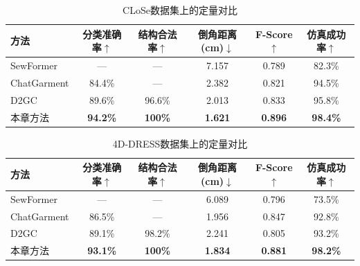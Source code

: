 \begin{table}[t]
    \centering\small
    \caption{CLoSe数据集上的定量对比}
    \label{tab:ch4-comparison-close}
    \setlength{\tabcolsep}{2pt}
    \renewcommand{\arraystretch}{1.2}
    \begin{tabular}{l *{5}{c}}
        \toprule
        \textbf{方法}
        & \textbf{分类准确率}$\uparrow$ & \textbf{结构合法率}$\uparrow$
        & \textbf{倒角距离 (cm)}$\downarrow$ & \textbf{F-Score}$\uparrow$
        & \textbf{仿真成功率}$\uparrow$ \\
        \midrule
        SewFormer\cite{liu2023sewformer}
        & — & — & 7.157 & 0.789 & 82.3\% \\
        ChatGarment\cite{bian2024chatgarment}
        & 84.4\% & — & 2.382 & 0.821 & 94.5\% \\
        D2GC\cite{zhou2025design2garmentcode}
        & 89.6\% & 96.6\% & 2.013 & 0.833 & 95.8\% \\
        本章方法
        & \textbf{94.2\%} & \textbf{100\%} & \textbf{1.621} & \textbf{0.896} & \textbf{98.4\%} \\
        \bottomrule
    \end{tabular}
\end{table}

\begin{table}[t]
    \centering\small
    \caption{4D-DRESS数据集上的定量对比}
    \label{tab:ch4-comparison-4ddress}
    \setlength{\tabcolsep}{2pt}
    \renewcommand{\arraystretch}{1.2}
    \begin{tabular}{lccccc}
        \toprule
        \textbf{方法}
        & \textbf{分类准确率}$\uparrow$ & \textbf{结构合法率}$\uparrow$
        & \textbf{倒角距离 (cm)}$\downarrow$ & \textbf{F-Score}$\uparrow$
        & \textbf{仿真成功率}$\uparrow$ \\
        \midrule
        SewFormer\cite{liu2023sewformer}
        & — & — & 6.089 & 0.796 & 73.5\% \\
        ChatGarment\cite{bian2024chatgarment}
        & 86.5\% & — & 1.956 & 0.847 & 92.8\% \\
        D2GC\cite{zhou2025design2garmentcode}
        & 89.1\% & 98.2\% & 2.241 & 0.805 & 93.2\% \\
        本章方法
        & \textbf{93.1\%} & \textbf{100\%} & \textbf{1.834} & \textbf{0.881} & \textbf{98.2\%} \\
        \bottomrule
    \end{tabular}
\end{table}
